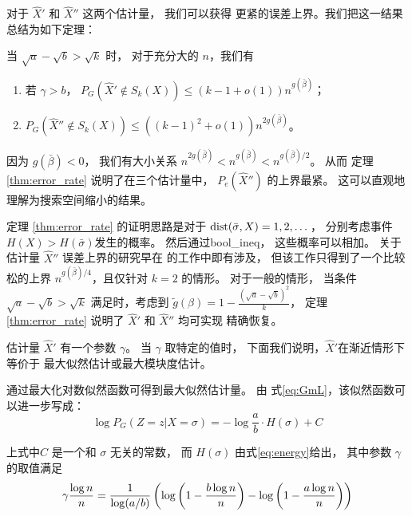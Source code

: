 对于 $\hat{X}'$ 和 $\hat{X}''$ 这两个估计量，
我们可以获得 更紧的误差上界。我们把这一结果总结为如下定理：
\begin{theorem}\label{thm:error_rate}
当 $\sqrt{a} - \sqrt{b} > \sqrt{k}$ 时，
对于充分大的 $n$，我们有 
\begin{enumerate}
	\item 若 $\gamma > b$， $P_G(\hat{X}' \not\in S_k(X)) \leq (k-1+o(1))n^{g(\bar{\beta})}$；
	\item $P_G(\hat{X}'' \not\in S_k(X)) \leq \left((k-1)^2+o(1) \right)n^{2g(\bar{\beta})}$。
\end{enumerate}
\end{theorem}
因为 $g(\bar{\beta})<0$， 我们有大小关系 $n^{2g(\bar{\beta})} < n^{g(\bar{\beta})} < n^{g(\bar{\beta})/2}$。
从而 定理 \ref{thm:error_rate} 说明了在三个估计量中，
$P_e(\hat{X}'')$ 
的上界最紧。
这可以直观地理解为搜索空间缩小的结果。

定理 \ref{thm:error_rate} 的证明思路是对于 $\operatorname{dist}(\bar{\sigma}, X) = 1, 2,\dots$，
分别考虑事件
$H(X) > H(\bar{\sigma})$发生的概率。
然后通过\gls{bool_ineq}， 这些概率可以相加。
关于估计量 $\hat{X}''$ 误差上界的研究早在\citet{abbe2015exact} 的工作中即有涉及，
但该工作只得到了一个比较松的上界 $n^{g(\bar{\beta})/4}$，且仅针对 $k=2$ 的情形。
对于一般的情形，
当条件
$\sqrt{a} - \sqrt{b} > \sqrt{k}$ 满足时，考虑到
$\tilde{g}(\beta) = 1- \frac{\left(\sqrt{a} - \sqrt{b}\right)^2}{k}$，
定理 \ref{thm:error_rate} 说明了  $\hat{X}'$ 和 $\hat{X}''$
均可实现
精确恢复。


估计量 $\hat{X}'$ 有一个参数 $\gamma$。
当 $\gamma$ 取特定的值时， 下面我们说明，$\hat{X}'$在渐近情形下
等价于 最大似然估计或最大模块度估计。

通过最大化对数似然函数可得到最大似然估计量。
由 式\eqref{eq:GmL}，该似然函数可以进一步写成：
\begin{equation}\label{eq:PG_energy}
	\log P_G(Z=z|X=\sigma) = -\log\frac{a}{b} \cdot H(\sigma) + C
\end{equation}

上式中$C$ 是一个和 $\sigma$ 无关的常数，
而 $H(\sigma)$ 由式\eqref{eq:energy}给出，
其中参数 $\gamma$ 的取值满足
\begin{equation}\label{eq:special_gamma_ML}
	\gamma \frac{\log n}{n} = \frac{1}{\log(a/b)}
	\left(\log \left(1-\frac{b \log n}{n} \right) - \log \left(1-\frac{a \log n}{n} \right) \right)	 
\end{equation}

